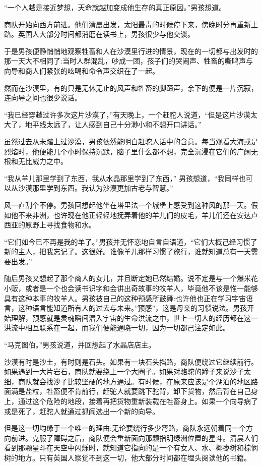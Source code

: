 \documentclass[twoside,openany]{book}
\begin{document}
“一个人越是接近梦想，天命就越加变成他生存的真正原因。”男孩想道。

商队开始向西方前进。他们清晨出发，太阳最毒的时候停下来，傍晚时分再重新上路。英国人大部分时间都消磨在读书上，男孩很少与他交谈。

于是男孩便静悄悄地观察牲畜和人在沙漠里行进的情景，现在的一切都与出发时的那一天大不相同了:当时人群混乱，吵成一团，孩子们的哭闹声、牲畜的嘶鸣声与向导和商人们紧张的吆喝和命令声交织在了一起。

然而在沙漠里，有的只是无休无止的风声和牲畜的脚蹄声，余下的便是一片沉寂，连向导之间也很少说话。

“我已经穿越过许多次这片沙漠了，”有天晚上，一个赶驼人说道，“但是这片沙漠太大了，地平线太远了，让人感到自己十分渺小和不想开口讲话。”

虽然过去从未踏上过沙漠，男孩依然能明白赶驼人话中的含意。每当观看大海或是烈焰时，他便能几个小时保持沉默，脑子里什么都不想，完全沉浸在它们的广阔无根和无比威力之中。

“我从羊儿那里学到了东西，我从水晶那里学到了东西，” 男孩想道，“我同样也可以从沙漠那里学到东西。我认为沙漠更加古老与智慧。”

风一直刮个不停。男孩回想起他坐在塔里法一个城堡上感受到这种风的那一天。假如他不来非洲，也许现在他正轻轻地抚弄着他的羊儿们的皮毛，羊儿们还在安达卢西亚的原野上寻找食物和水。

“它们如今已不再是我的羊了。”男孩并无怀恋地自言自语道，“它们大概己经习惯了新的主人，把我忘记了。这很好。谁像羊儿那样习惯了旅行，谁就知道总有一天需要出发。”

随后男孩又想起了那个商人的女儿，并且断定她已然结婚。说不定是与一个爆米花小贩，或者是一个也会读书识字和会讲出奇故事的牧羊人，毕竟他不该是惟一能够具有这种本事的牧羊人。男孩被自己的这种预感所鼓舞:也许他也正在学习宇宙语言，这种语言能知道所有人的过去与未来。”预感”，这是母亲的习惯说法。男孩开始理解，预感就是灵魂瞬间潜入宇宙的生命洪流之中，世上一切人的经历都在这一洪流中相互联系在一起，而我们便能通晓一切，因为一切都己注定如此。

“马克图伯。”男孩说道，并回想起了水晶店店主。

沙漠有时是沙土，有时则是石头。如果有一块石头挡路，商队便绕过它继续前行。如果遇到一大片岩石，商队就要绕上一个大圈子。如果对骆驼的蹄子来说沙子太细，商队就会找沙子比较坚硬的地方通过。有时候，在原来应该是个湖泊的地区路面满是盐粒，牲畜便不肯前行，赶驼人就要跳下驼背，卸下货物，然后背在自己身上，通过这个危险的地段，接着再把货物重新装载在牲畜身上。如果一个向导病了或是死了，赶驼人就通过抓阎选出一个新的向导。

但是这一切均缘于一个唯一的理由:无论要绕行多少弯路，商队永远朝着同一个方向前进。克服了障碍之后，商队便会重新面向那颗指明绿洲位置的星斗。清晨人们看到那颗星斗在天空中闪烁时，就知道它指向的是一个有女人、水、椰枣树和棕悯树的地方。只有英国人察觉不到这一切，他大部分时间都在埋头阅读他的书籍。
\end{document}
